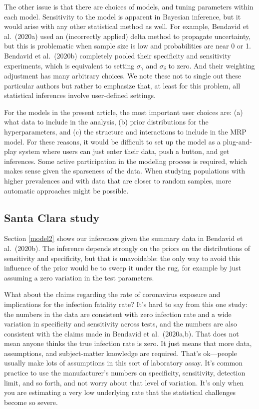 \documentclass[11pt]{article}
\begin{document}
The other issue is that there are choices of models, and tuning parameters within each model.  Sensitivity to the model is apparent in Bayesian inference, but it would arise with any other statistical method as well.  For example, Bendavid et al.\ (2020a) used an (incorrectly applied) delta method to propagate uncertainty, but this is problematic when sample size is low and probabilities are near 0 or 1.  Bendavid  et al.\ (2020b) completely pooled their specificity and sensitivity experiments, which is equivalent to setting $\sigma_{\gamma}$ and $\sigma_{\delta}$ to zero.  And their weighting adjustment has many arbitrary choices.  We note these not to single out these particular authors but rather to emphasize that, at least for this problem, all statistical inferences involve user-defined settings.

For the models in the present article, the most important user choices are:  (a) what data to include in the analysis, (b) prior distributions for the hyperparameters, and (c) the structure and interactions to include in the MRP model.  For these reasons, it would be difficult to set up the model as a plug-and-play system where users can just enter their data, push a button, and get inferences.  Some active participation in the modeling process is required, which makes sense given the sparseness of the data.  When studying populations with higher prevalences and with data that are closer to random samples, more automatic approaches might be possible.

\subsection{Santa Clara study}

Section \ref{model2} shows our inferences given the summary data in Bendavid et al.\ (2020b).
The inference depends strongly on the priors on the distributions of sensitivity and specificity, but that is unavoidable:  the only way to avoid this influence of the prior would be to sweep it under the rug, for example by just assuming a zero variation in the test parameters.

What about the claims regarding the rate of coronavirus exposure and implications for the infection fatality rate?  It's hard to say from this one study:  the numbers in the data are consistent with zero infection rate and a wide variation in specificity and sensitivity across tests, and the numbers are also consistent with the claims made in Bendavid et al.\ (2020a,b). That does not mean anyone thinks the true infection rate is zero.  It just means that more data, assumptions, and subject-matter knowledge are required. That's ok---people usually make lots of assumptions in this sort of laboratory assay. It's common practice to use the manufacturer's numbers on specificity, sensitivity, detection limit, and so forth, and not worry about that level of variation. It's only when you are estimating a very low underlying rate that the statistical challenges become so severe.
\end{document}
